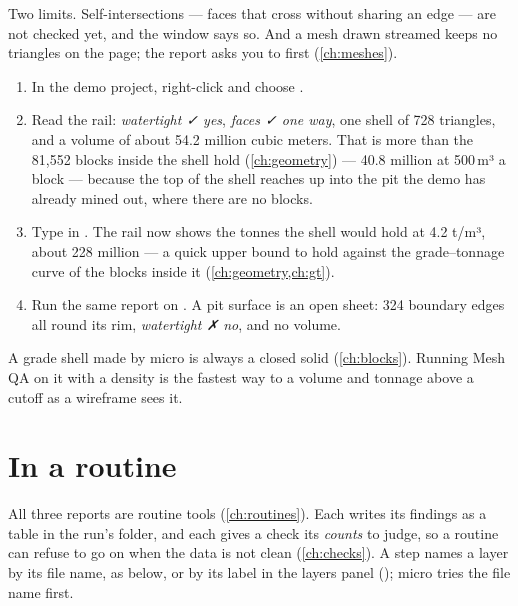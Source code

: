 Two limits. Self-intersections — faces that cross without sharing an edge — are not checked yet, and the window says so. And a mesh drawn streamed keeps no triangles on the page; the report asks you to  first (\cref{ch:meshes}).

\begin{tryit}
\begin{enumerate}
\item In the demo project, right-click  and choose .
\item Read the rail: \emph{watertight ✓ yes}, \emph{faces ✓ one way}, one shell of 728 triangles, and a volume of about 54.2 million cubic meters. That is more than the 81,552 blocks inside the shell hold (\cref{ch:geometry}) — 40.8 million at 500\,m³ a block — because the top of the shell reaches up into the pit the demo has already mined out, where there are no blocks.
\item Type  in . The rail now shows the tonnes the shell would hold at 4.2 t/m³, about 228 million — a quick upper bound to hold against the grade–tonnage curve of the blocks inside it (\cref{ch:geometry,ch:gt}).
\item Run the same report on . A pit surface is an open sheet: 324 boundary edges all round its rim, \emph{watertight ✗ no}, and no volume.
\end{enumerate}
\end{tryit}

\begin{tip}
A grade shell made by micro is always a closed solid (\cref{ch:blocks}). Running Mesh QA on it with a density is the fastest way to a volume and tonnage above a cutoff as a wireframe sees it.
\end{tip}

\section{In a routine}\label{sec:qa-routine}

All three reports are routine tools (\cref{ch:routines}). Each writes its findings as a table in the run's folder, and each gives a check its \emph{counts} to judge, so a routine can refuse to go on when the data is not clean (\cref{ch:checks}). A step names a layer by its file name, as  below, or by its label in the layers panel (); micro tries the file name first.

